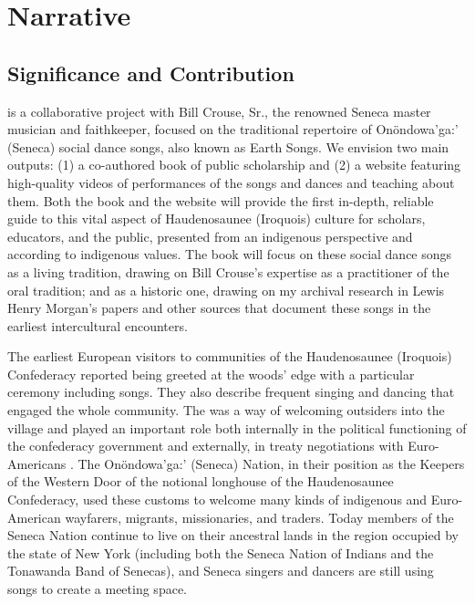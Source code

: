 \documentclass{neh}
\begin{document}
\section{Narrative}
\subsection{Significance and Contribution}

 is a
collaborative project with Bill Crouse, Sr., the renowned Seneca master
musician and faithkeeper, focused on the traditional repertoire of
Onöndowa'ga:' (Seneca) social dance songs, also known as Earth Songs.
We envision two main outputs: (1) a co-authored book of public scholarship and
(2) a website featuring high-quality videos of performances of the songs and
dances and teaching about them.
Both the book and the website will provide the first in-depth, reliable
guide to this vital aspect of Haudenosaunee (Iroquois) culture for scholars,
educators, and the public, presented from an indigenous perspective and
according to indigenous values.  
The book will focus on these social dance songs as a living tradition, drawing
on Bill Crouse’s expertise as a practitioner of the oral tradition; and as a
historic one, drawing on my archival research in Lewis Henry Morgan’s papers
and other sources that document these songs in the earliest intercultural
encounters. 

The earliest European visitors to communities of the Haudenosaunee (Iroquois)
Confederacy reported being greeted at the woods' edge with a particular
ceremony including songs.
They also describe frequent singing and dancing that engaged the whole
community.
The  was a way of welcoming outsiders into
the village and played an important role both internally in the political
functioning of the confederacy government and externally, in treaty
negotiations with Euro-Americans
\Autocites{Richter:Ordeal}{Fenton:GreatLaw}.
The Onöndowa’ga:’ (Seneca) Nation, in their position as the Keepers of the
Western Door of the notional longhouse of the Haudenosaunee Confederacy,
used these customs to welcome many kinds of indigenous and Euro-American
wayfarers, migrants, missionaries, and traders.
Today members of the Seneca Nation continue to live on their ancestral lands
in the region occupied by the state of New York (including both the Seneca
Nation of Indians and the Tonawanda Band of Senecas), and Seneca singers and
dancers are still using songs to create a meeting space.
\end{document}
